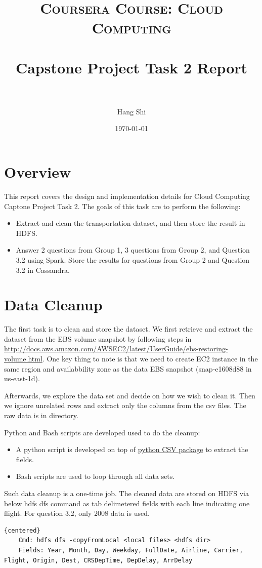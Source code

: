 \documentclass[fontsize=11pt,paper=a4]{scrartcl}
\title{
		\usefont{OT1}{bch}{b}{n}
		\normalfont \normalsize \textsc
		{Coursera Course: Cloud Computing} \\ [25pt]
		\horrule{0.5pt} \\[0.4cm]
		\huge Capstone Project Task 2 Report \\
		\horrule{2pt} \\[0.5cm]
}
\author{Hang Shi\\[-3pt] }
\date{\today\\[-3pt]}
\begin{document}
\maketitle

\section{Overview}
This report covers the design and implementation details for Cloud Computing Captone Project Task 2. The goals of this task are to perform the following:
\begin{itemize}
\item Extract and clean the transportation dataset, and then store the result in HDFS.
\item Answer 2 questions from Group 1, 3 questions from Group 2, and Question 3.2 using Spark. Store the results for questions from Group 2 and Question 3.2 in Cassandra.   
\end{itemize}
 
\section{Data Cleanup}
The first task is to clean and store the dataset. We  first retrieve and extract the dataset from the EBS volume snapshot by following steps in \url{http://docs.aws.amazon.com/AWSEC2/latest/UserGuide/ebs-restoring-volume.html}. One key thing to note is that we need to create EC2 instance in the same region and availabbility zone as the data EBS snapshot (snap-e1608d88 in us-east-1d).   

Afterwards, we explore the data set and decide on how we wish to clean it. Then we ignore unrelated rows and extract only the columns from the csv files. The raw data is in  directory. 

Python and Bash scripts are developed used to do the cleanup: 
\begin{itemize} 
\item A python script is developed on top of \href{https://docs.python.org/2/library/csv.html}{python CSV package} to extract the fields. 
\item Bash scripts are used to loop through all data sets. 
\end{itemize}

Such data cleanup is a one-time job. The cleaned data are stored on HDFS via below hdfs dfs command  as tab delimetered fields with each line indicating one flight. For question 3.2, only 2008 data is used. 
\begin{lstlisting}{centered}
	Cmd: hdfs dfs -copyFromLocal <local files> <hdfs dir>  
	Fields: Year, Month, Day, Weekday, FullDate, Airline, Carrier, Flight, Origin, Dest, CRSDepTime, DepDelay, ArrDelay
\end{lstlisting}
\end{document}
